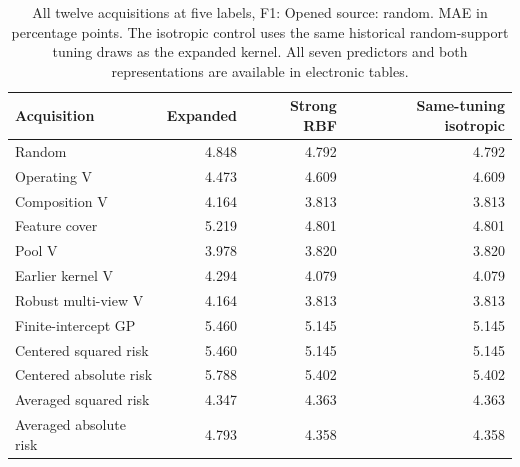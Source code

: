 \begin{table}[htbp]\centering\small
\caption{All twelve acquisitions at five labels, F1: Opened source: random. MAE in percentage points. The isotropic control uses the same historical random-support tuning draws as the expanded kernel. All seven predictors and both representations are available in electronic tables.}\label{tab:step10all1}
\begin{tabular}{lrrr}\toprule
Acquisition & Expanded & Strong RBF & Same-tuning isotropic \\ \midrule
Random & 4.848 & 4.792 & 4.792 \\
Operating V & 4.473 & 4.609 & 4.609 \\
Composition V & 4.164 & 3.813 & 3.813 \\
Feature cover & 5.219 & 4.801 & 4.801 \\
Pool V & 3.978 & 3.820 & 3.820 \\
Earlier kernel V & 4.294 & 4.079 & 4.079 \\
Robust multi-view V & 4.164 & 3.813 & 3.813 \\
Finite-intercept GP & 5.460 & 5.145 & 5.145 \\
Centered squared risk & 5.460 & 5.145 & 5.145 \\
Centered absolute risk & 5.788 & 5.402 & 5.402 \\
Averaged squared risk & 4.347 & 4.363 & 4.363 \\
Averaged absolute risk & 4.793 & 4.358 & 4.358 \\
\bottomrule\end{tabular}
\end{table}
